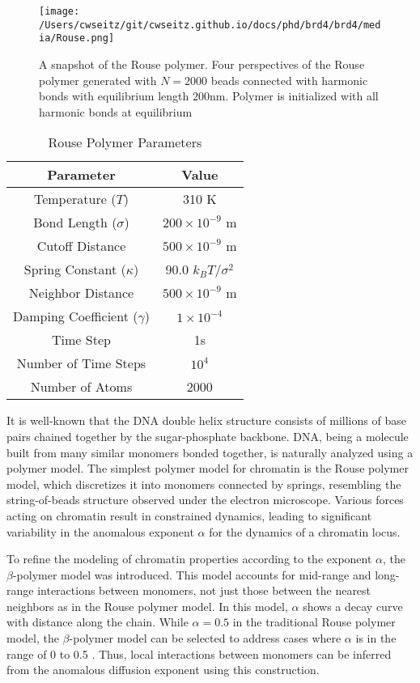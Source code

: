 \begin{figure}[t]
\texttt{[image: /Users/cwseitz/git/cwseitz.github.io/docs/phd/brd4/brd4/media/Rouse.png]}
\caption{A snapshot of the Rouse polymer. Four perspectives of the Rouse polymer generated with $N=2000$ beads connected with harmonic bonds with equilibrium length $200\mathrm{nm}$. Polymer is initialized with all harmonic bonds at equilibrium}
\end{figure}

\begin{table}[h!]
\centering
\begin{tabular}{|c|c|}
\hline
\textbf{Parameter} & \textbf{Value} \\ \hline
Temperature ($T$) & 310 K \\ \hline
Bond Length ($\sigma$) & $200 \times 10^{-9}$ m \\ \hline
Cutoff Distance & $500 \times 10^{-9}$ m \\ \hline
Spring Constant ($\kappa$) & 90.0 $k_{B}T/\sigma^2$ \\ \hline
Neighbor Distance & $500 \times 10^{-9}$ m \\ \hline
Damping Coefficient ($\gamma$) & $1 \times 10^{-4}$ \\ \hline
Time Step & 1s\\ \hline
Number of Time Steps & $10^4$ \\ \hline
Number of Atoms & 2000 \\ \hline
\end{tabular}
\caption{Rouse Polymer Parameters}
\end{table}

It is well-known that the DNA double helix structure consists of millions of base pairs chained together by the sugar-phosphate backbone. DNA, being a molecule built from many similar monomers bonded together, is naturally analyzed using a polymer model. The simplest polymer model for chromatin is the Rouse polymer model, which discretizes it into monomers connected by springs, resembling the string-of-beads structure observed under the electron microscope. Various forces acting on chromatin result in constrained dynamics, leading to significant variability in the anomalous exponent $\alpha$ for the dynamics of a chromatin locus.

To refine the modeling of chromatin properties according to the exponent $\alpha$, the $\beta$-polymer model was introduced. This model accounts for mid-range and long-range interactions between monomers, not just those between the nearest neighbors as in the Rouse polymer model. In this model, $\alpha$ shows a decay curve with distance along the chain. While $\alpha = 0.5$ in the traditional Rouse polymer model, the $\beta$-polymer model can be selected to address cases where $\alpha$ is in the range of 0 to 0.5 \parencite{Amitai2013,Amitai2017,Hajjoul2013}. Thus, local interactions between monomers can be inferred from the anomalous diffusion exponent using this construction.

